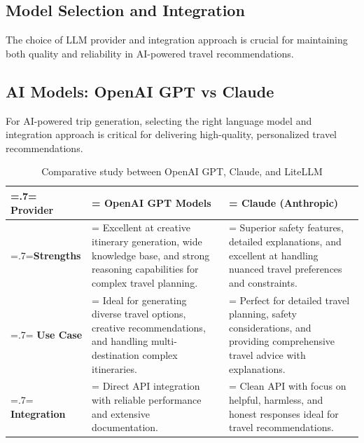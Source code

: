 \subsection{Model Selection and Integration}
The choice of LLM provider and integration approach is crucial for maintaining both quality and reliability in AI-powered travel recommendations.

\subsection{AI Models: OpenAI GPT vs Claude}
For AI-powered trip generation, selecting the right language model and integration approach is critical for delivering high-quality, personalized travel recommendations.

\begin{table}[H]
    \renewcommand{\arraystretch}{1.5}
    \caption{Comparative study between OpenAI GPT, Claude, and LiteLLM}
    \centering
    \medskip
    \begin{tabularx}{1\textwidth} {
            | >{\hsize=.7\hsize\linewidth=\hsize\centering\arraybackslash}X
            | >{\hsize=1.15\hsize\linewidth=\hsize\justifying\arraybackslash}X
            | >{\hsize=1.15\hsize\linewidth=\hsize\justifying\arraybackslash}X |}
        \hline
        \rowcolor{primary} \textbf {Provider} & \textbf {OpenAI GPT Models}                                                                                                               & \textbf {Claude (Anthropic)}                                                                                                        \\
        \hline
        \textbf {Strengths}                   & \noindent Excellent at creative itinerary generation, wide knowledge base, and strong reasoning capabilities for complex travel planning. & \noindent Superior safety features, detailed explanations, and excellent at handling nuanced travel preferences and constraints.    \\
        \hline
        \textbf {Use Case}                    & \noindent Ideal for generating diverse travel options, creative recommendations, and handling multi-destination complex itineraries.      & \noindent Perfect for detailed travel planning, safety considerations, and providing comprehensive travel advice with explanations. \\
        \hline
        \textbf {Integration}                 & \noindent Direct API integration with reliable performance and extensive documentation.                                                   & \noindent Clean API with focus on helpful, harmless, and honest responses ideal for travel recommendations.                         \\
        \hline
    \end{tabularx}
\end{table}

